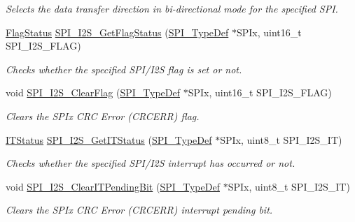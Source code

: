 \begin{DoxyCompactItemize}
\begin{DoxyCompactList}\small\item\em Selects the data transfer direction in bi-\/directional mode for the specified S\+PI. \end{DoxyCompactList}\item 
\hyperlink{group___exported__types_ga89136caac2e14c55151f527ac02daaff}{Flag\+Status} \hyperlink{group___s_p_i___exported___functions_ga1bd785d129e09c5734a876c8f2767204}{S\+P\+I\+\_\+\+I2\+S\+\_\+\+Get\+Flag\+Status} (\hyperlink{struct_s_p_i___type_def}{S\+P\+I\+\_\+\+Type\+Def} $\ast$S\+P\+Ix, uint16\+\_\+t S\+P\+I\+\_\+\+I2\+S\+\_\+\+F\+L\+AG)
\begin{DoxyCompactList}\small\item\em Checks whether the specified S\+P\+I/\+I2S flag is set or not. \end{DoxyCompactList}\item 
void \hyperlink{group___s_p_i___exported___functions_ga3aabd9e2437e213056c0ed9bdfa1a724}{S\+P\+I\+\_\+\+I2\+S\+\_\+\+Clear\+Flag} (\hyperlink{struct_s_p_i___type_def}{S\+P\+I\+\_\+\+Type\+Def} $\ast$S\+P\+Ix, uint16\+\_\+t S\+P\+I\+\_\+\+I2\+S\+\_\+\+F\+L\+AG)
\begin{DoxyCompactList}\small\item\em Clears the S\+P\+Ix C\+RC Error (C\+R\+C\+E\+RR) flag. \end{DoxyCompactList}\item 
\hyperlink{group___exported__types_gaacbd7ed539db0aacd973a0f6eca34074}{I\+T\+Status} \hyperlink{group___s_p_i___exported___functions_ga72decbc1cd79f8fad92a2204beca6bc5}{S\+P\+I\+\_\+\+I2\+S\+\_\+\+Get\+I\+T\+Status} (\hyperlink{struct_s_p_i___type_def}{S\+P\+I\+\_\+\+Type\+Def} $\ast$S\+P\+Ix, uint8\+\_\+t S\+P\+I\+\_\+\+I2\+S\+\_\+\+IT)
\begin{DoxyCompactList}\small\item\em Checks whether the specified S\+P\+I/\+I2S interrupt has occurred or not. \end{DoxyCompactList}\item 
void \hyperlink{group___s_p_i___exported___functions_ga35a524a49ff3d058137060f751e8749f}{S\+P\+I\+\_\+\+I2\+S\+\_\+\+Clear\+I\+T\+Pending\+Bit} (\hyperlink{struct_s_p_i___type_def}{S\+P\+I\+\_\+\+Type\+Def} $\ast$S\+P\+Ix, uint8\+\_\+t S\+P\+I\+\_\+\+I2\+S\+\_\+\+IT)
\begin{DoxyCompactList}\small\item\em Clears the S\+P\+Ix C\+RC Error (C\+R\+C\+E\+RR) interrupt pending bit. \end{DoxyCompactList}\end{DoxyCompactItemize}


